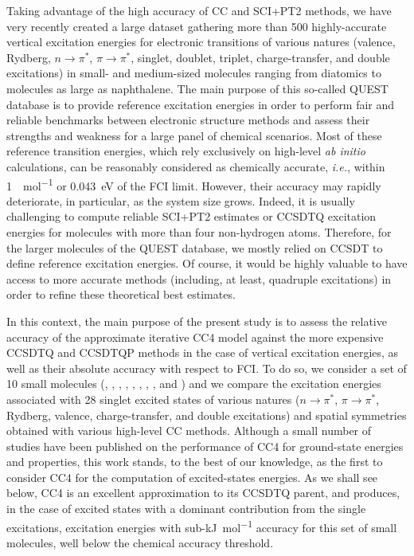 \documentclass[aip,jcp,reprint,noshowkeys,superscriptaddress]{revtex4-1}
\newcommand{\ie}{\textit{i.e.}}
\newcommand{\npis}{n \to \pi^*}
\newcommand{\pipis}{\pi \to \pi^*}
\begin{document}
Taking advantage of the high accuracy of CC and SCI+PT2 methods, we have very recently created a large dataset gathering more than 500 highly-accurate vertical excitation energies for electronic transitions of various natures (valence, Rydberg, $\npis$, $\pipis$, singlet, doublet, triplet, charge-transfer, and double excitations) in small- and medium-sized molecules ranging from diatomics to molecules as large as naphthalene. \cite{Loos_2018a,Loos_2019,Loos_2020a,Loos_2020b,Loos_2020c,Veril_2021}
The main purpose of this so-called QUEST database is to provide reference excitation energies in order to perform fair and reliable benchmarks between electronic structure methods and assess their strengths and weakness for a large panel of chemical scenarios.
Most of these reference transition energies, which rely exclusively on high-level \textit{ab initio} calculations, can be reasonably considered as chemically accurate, \ie, within \SI{1}{\kcal\per\mol} or \SI{0.043}{\eV} of the FCI limit.
However, their accuracy may rapidly deteriorate, in particular, as the system size grows.
Indeed, it is usually challenging to compute reliable SCI+PT2 estimates or CCSDTQ excitation energies for molecules with more than four non-hydrogen atoms.
Therefore, for the larger molecules of the QUEST database, we mostly relied on CCSDT to define reference excitation energies.
Of course, it would be highly valuable to have access to more accurate methods (including, at least, quadruple excitations) in order to refine these theoretical best estimates.

In this context, the main purpose of the present study is to assess the relative accuracy of the approximate iterative CC4 model against the more expensive CCSDTQ and CCSDTQP methods in the case of vertical excitation energies, as well as their absolute accuracy with respect to FCI.
To do so, we consider a set of 10 small molecules (, , , , , , , ,  and ) and we compare the excitation energies associated with 28 singlet excited states of various natures ($\npis$, $\pipis$, Rydberg, valence, charge-transfer, and double excitations) and spatial symmetries obtained with various high-level CC methods.
Although a small number of studies have been published on the performance of CC4 for ground-state energies and properties, \cite{Kallay_2005,Matthews_2021} this work stands, to the best of our knowledge, as the first to consider CC4 for the computation of excited-states energies.
As we shall see below, CC4 is an excellent approximation to its CCSDTQ parent, and produces, in the case of excited states with a dominant contribution from the single excitations, excitation energies with sub-\si{\kJ\per\mol} accuracy for this set of small molecules, well below the chemical accuracy threshold.
\end{document}
